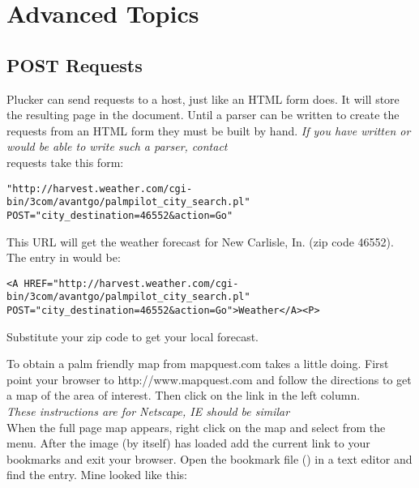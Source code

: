 %
%
\chapter{Advanced Topics}

\section{POST Requests}

Plucker can send  requests to a host, 
just like an HTML form does. It will store the resulting page in the 
document. Until a parser can be written to create the requests from 
an HTML form they must be built by hand. \emph{If you have written or 
would be able to write such a parser, contact \devaddress}\\

 requests take this form:

\begin{verbatim}
"http://harvest.weather.com/cgi-bin/3com/avantgo/palmpilot_city_search.pl" POST="city_destination=46552&action=Go"
\end{verbatim}

This URL will get the weather forecast for New Carlisle, In. (zip code 46552).  
The entry in  would be:

\begin{verbatim}
<A HREF="http://harvest.weather.com/cgi-bin/3com/avantgo/palmpilot_city_search.pl" POST="city_destination=46552&action=Go">Weather</A><P>
\end{verbatim}

Substitute your zip code to get your local forecast.

To obtain a palm friendly map from mapquest.com takes a little doing. 
First point your browser to 
{http://www.mapquest.com} and follow the directions to get a map of 
the area of interest. Then click on the  
link in the left column.\\

\note{} \emph{These instructions are for Netscape, IE should be similar}\\
When the full page map appears, right click on the map and select 
 from the menu. After the image (by itself) has 
loaded add the current link to your bookmarks and exit your browser. 
Open the bookmark file () in a text 
editor and find the entry. Mine looked like this:

